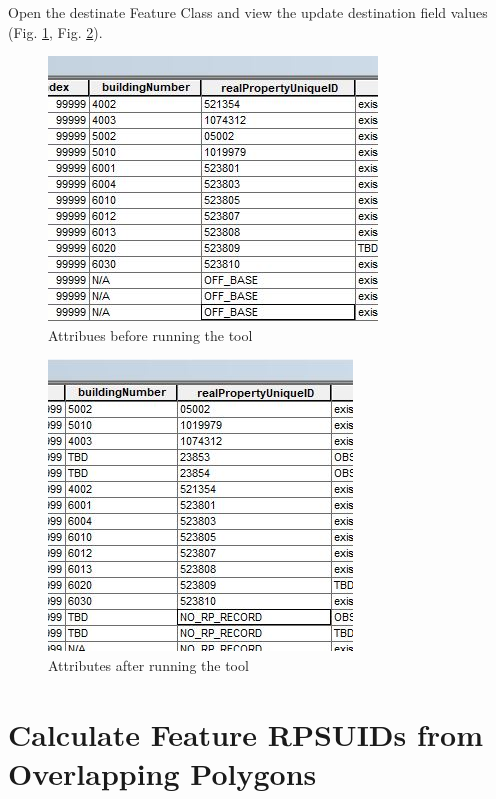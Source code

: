 \documentclass[openany]{book}
\theoremstyle{definition}
\theoremstyle{definition}
\theoremstyle{definition}
\theoremstyle{remark}
\begin{document}
Open the destinate Feature Class and view the update destination field
values (Fig. \ref{fig:jcbefore}, Fig. \ref{fig:jcafter}).

\begin{figure}[H]

{\centering \includegraphics{figures/joinCalc-before} 

}

\caption{Attribues before running the tool}\label{fig:jcbefore}
\end{figure}

\begin{figure}[H]

{\centering \includegraphics{figures/joinCalc-results} 

}

\caption{Attributes after running the tool}\label{fig:jcafter}
\end{figure}

\hypertarget{spatjoinCalc}{\chapter{Calculate Feature RPSUIDs from
Overlapping Polygons}\label{spatjoinCalc}}
\end{document}
